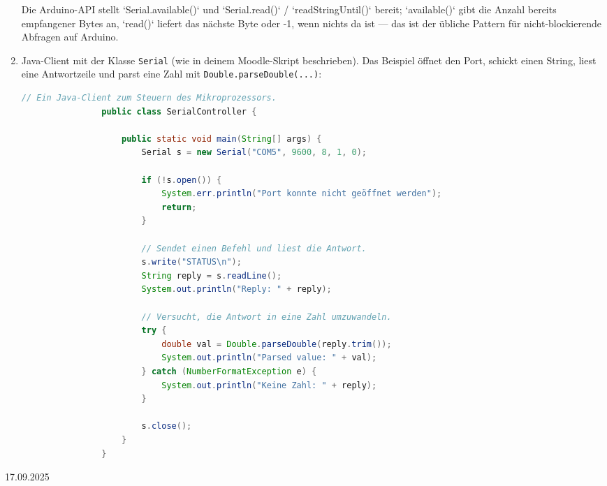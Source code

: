 \documentclass[11pt,a4paper,oneside]{article}
\newcounter{beispiel}[section]
\newcounter{loesung}[section]
\renewcommand{\theloesung}{\thesection.\arabic{loesung}}
\newenvironment{loesung}[1]{%
	\refstepcounter{loesung}%
	\begin{tcolorbox}[termbase,
		colframe=loesungColor!50!black,
		boxed title style={interior style={left color=loesungColor, right color=loesungColor!70!black}},
		title={Lösung~\theloesung: #1}]%
	}{\end{tcolorbox}}
\newcommand{\lessondate}[1]{\noindent\hfill\textcolor{Steel}{\textsc{#1}}\\[6pt]}
\begin{document}
\begin{loesung}{Steuerung eines Mikroprozessors mit der seriellen Schnittstelle}
\begin{enumerate}
			Die Arduino-API stellt `Serial.available()` und `Serial.read()` / `readStringUntil()` bereit; `available()` gibt die Anzahl bereits empfangener Bytes an, `read()` liefert das nächste Byte oder -1, wenn nichts da ist — das ist der übliche Pattern für nicht-blockierende Abfragen auf Arduino.
			
			\item Java-Client mit der Klasse \texttt{Serial} (wie in deinem Moodle-Skript beschrieben). Das Beispiel öffnet den Port, schickt einen String, liest eine Antwortzeile und parst eine Zahl mit \texttt{Double.parseDouble(...)}:
			\begin{lstlisting}[language=Java, caption={Java: Steuerprogramm (Nutzungsbeispiel der in der Aufgabenstellung beschriebenen Serial-Klasse)}]
				// Ein Java-Client zum Steuern des Mikroprozessors.
				public class SerialController {
					
					public static void main(String[] args) {
						Serial s = new Serial("COM5", 9600, 8, 1, 0); 
						
						if (!s.open()) {
							System.err.println("Port konnte nicht geöffnet werden");
							return;
						}
						
						// Sendet einen Befehl und liest die Antwort.
						s.write("STATUS\n");
						String reply = s.readLine();
						System.out.println("Reply: " + reply);
						
						// Versucht, die Antwort in eine Zahl umzuwandeln.
						try {
							double val = Double.parseDouble(reply.trim());
							System.out.println("Parsed value: " + val);
						} catch (NumberFormatException e) {
							System.out.println("Keine Zahl: " + reply);
						}
						
						s.close();
					}
				}
			\end{lstlisting}
		\end{enumerate}
	\end{loesung}
	
	\newpage

	\lessondate{17.09.2025}\\
\end{document}
